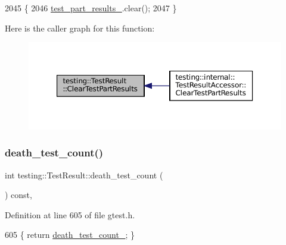 \begin{DoxyCode}
2045                                       \{
2046   \hyperlink{classtesting_1_1TestResult_af17c00fae1435d344b318eb6bbb56cff}{test\_part\_results\_}.clear();
2047 \}
\end{DoxyCode}
Here is the caller graph for this function\+:
\nopagebreak
\begin{figure}[H]
\begin{center}
\leavevmode
\includegraphics[width=350pt]{classtesting_1_1TestResult_aa11ed718e0a76a39e6380e5ddce7cae2_icgraph}
\end{center}
\end{figure}
\mbox{\label{classtesting_1_1TestResult_a827cb78135ac375d81d89ffedc3eca52}} 
\subsubsection{\texorpdfstring{death\+\_\+test\+\_\+count()}{death\_test\_count()}}
{\footnotesize\ttfamily int testing\+::\+Test\+Result\+::death\+\_\+test\+\_\+count (\begin{DoxyParamCaption}{ }\end{DoxyParamCaption}) const\hspace{0.3cm}{\ttfamily [inline]}, {\ttfamily [private]}}



Definition at line 605 of file gtest.\+h.


\begin{DoxyCode}
605 \{ \textcolor{keywordflow}{return} \hyperlink{classtesting_1_1TestResult_a3810b34e68f5dca9ad1237a5bde7fa21}{death\_test\_count\_}; \}
\end{DoxyCode}
\mbox{\label{classtesting_1_1TestResult_a717e05e00d4af5cb809433e343ab63af}} 
